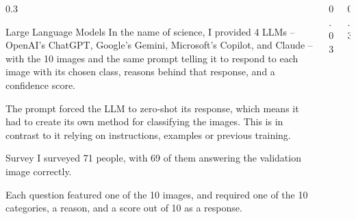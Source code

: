 \documentclass{beamer} %
\begin{document}
\begin{frame}[t]
\begin{columns}[t]
\begin{column}{0.3\textwidth}
\begin{block}{Large Language Models}
	\bigskip
	In the name of science, I provided 4 LLMs -- OpenAI's ChatGPT, Google's Gemini, Microsoft's Copilot, and Claude -- with the 10 images and the same prompt telling it to respond to each image with its chosen class, reasons behind that response, and a confidence score.

	\bigskip
	The prompt forced the LLM to zero-shot its response, which means it had to create its own method for classifying the images. This is in contrast to it relying on instructions, examples or previous training.
\end{block}

\begin{block}{Survey}
	I surveyed 71 people, with 69 of them answering the validation image correctly.

	\bigskip
	Each question featured one of the 10 images, and required one of the 10 categories, a reason, and a score out of 10 as a response.
\end{block}


\end{column} %

\begin{column}{0.03\textwidth}\end{column} %
 
\begin{column}{0.3\textwidth} %




\end{column}
\end{columns}
\end{frame}
\end{document}
